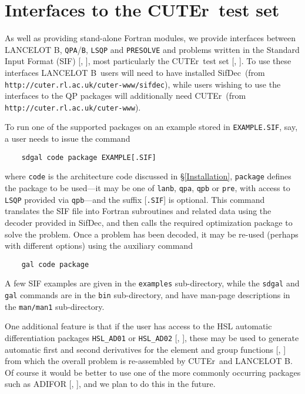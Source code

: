 \documentclass[acmtocl,acmnow]{acmtrans2m}
\newcommand{\lanb}{{\sf LANCELOT B}}
\newcommand{\cuter}{{\sf CUTEr}}
\newcommand{\sifdec}{{\sf SifDec}}
\newcommand{\bciteb}[1]{\citeauthor{#1}, \citeyear{#1}}
\begin{document}
\section{Interfaces to the \cuter\ test set}

As well as providing stand-alone Fortran modules, we provide
interfaces between \lanb, {\tt QPA}/{\tt B}, {\tt LSQP} and {\tt PRESOLVE} and
problems written in the Standard Input Format (SIF)
[\bciteb{ConnGoulToin92}], most particularly
the \cuter\ test set [\bciteb{GoulOrbaToin02b}]. To use these
interfaces \lanb\ users will need to have installed
\sifdec\ (from {\tt http://cuter.rl.ac.uk/cuter-www/sifdec}),
while users wishing to use the interfaces to the QP packages
will additionally need \cuter\
(from  {\tt http://cuter.rl.ac.uk/cuter-www}).

To run one of the supported packages on an example stored in
{\tt EXAMPLE.SIF}, say, a user needs to issue the command
\begin{verbatim}
    sdgal code package EXAMPLE[.SIF]
\end{verbatim}
where {\tt code} is the architecture code discussed in \S\ref{Installation},
{\tt package} defines the package to be used---it may be one of {\tt lanb},
{\tt qpa}, {\tt qpb} or {\tt pre}, with access to {\tt LSQP}
provided via {\tt qpb}---and the suffix [{\tt .SIF}] is optional.
This command translates the SIF file into Fortran subroutines and
related data using the decoder provided in \sifdec, and then calls
the required optimization package to solve the problem. Once a problem
has been decoded, it may be re-used (perhaps with different options)
using the auxiliary command
\begin{verbatim}
    gal code package
\end{verbatim}
A few SIF examples are given in the {\tt examples} sub-directory, while the
{\tt sdgal} and {\tt gal} commands are in the {\tt bin} sub-directory, and
have man-page descriptions in the {\tt man/man1} sub-directory.

One additional feature is that if the user has
access to the HSL automatic differentiation packages {\tt HSL\_AD01}
or {\tt HSL\_AD02} [\bciteb{PrycReid98}],
these may be used to generate automatic first and second derivatives
for the element and group functions [\bciteb{ConnGoulToin92}]
from which the overall problem is re-assembled by \cuter\ and \lanb.
Of course it would be better to use one of the more
commonly occurring packages
such as  ADIFOR [\bciteb{BiscCarlCorlGrieHovl92}],
and we plan to do this in the future.
\end{document}
